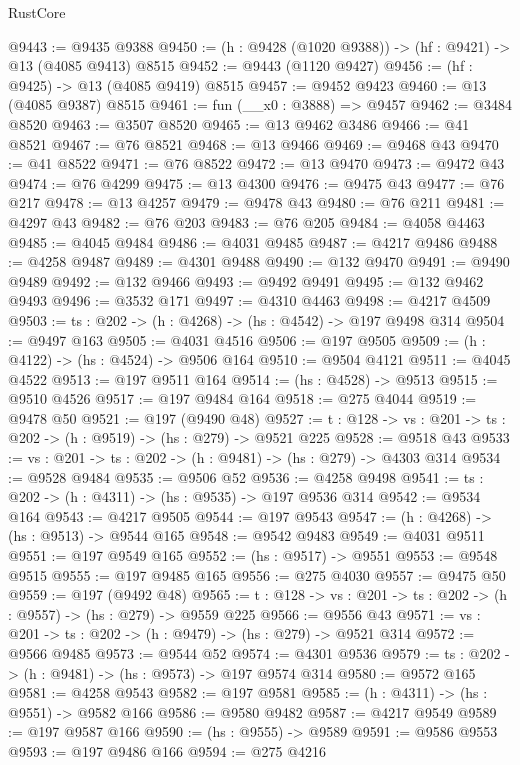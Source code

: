 \begin{lexlean}{RustCore}
\begin{coremodule}
@9443 := @9435 @9388
@9450 := (h : @9428 (@1020 @9388)) -> (hf : @9421) -> @13 (@4085 @9413) @8515
@9452 := @9443 (@1120 @9427)
@9456 := (hf : @9425) -> @13 (@4085 @9419) @8515
@9457 := @9452 @9423
@9460 := @13 (@4085 @9387) @8515
@9461 := fun (__x0 : @3888) => @9457
@9462 := @3484 @8520
@9463 := @3507 @8520
@9465 := @13 @9462 @3486
@9466 := @41 @8521
@9467 := @76 @8521
@9468 := @13 @9466
@9469 := @9468 @43
@9470 := @41 @8522
@9471 := @76 @8522
@9472 := @13 @9470
@9473 := @9472 @43
@9474 := @76 @4299
@9475 := @13 @4300
@9476 := @9475 @43
@9477 := @76 @217
@9478 := @13 @4257
@9479 := @9478 @43
@9480 := @76 @211
@9481 := @4297 @43
@9482 := @76 @203
@9483 := @76 @205
@9484 := @4058 @4463
@9485 := @4045 @9484
@9486 := @4031 @9485
@9487 := @4217 @9486
@9488 := @4258 @9487
@9489 := @4301 @9488
@9490 := @132 @9470
@9491 := @9490 @9489
@9492 := @132 @9466
@9493 := @9492 @9491
@9495 := @132 @9462 @9493
@9496 := @3532 @171
@9497 := @4310 @4463
@9498 := @4217 @4509
@9503 := {ts : @202} -> (h : @4268) -> (hs : @4542) -> @197 @9498 @314
@9504 := @9497 @163
@9505 := @4031 @4516
@9506 := @197 @9505
@9509 := (h : @4122) -> (hs : @4524) -> @9506 @164
@9510 := @9504 @4121
@9511 := @4045 @4522
@9513 := @197 @9511 @164
@9514 := (hs : @4528) -> @9513
@9515 := @9510 @4526
@9517 := @197 @9484 @164
@9518 := @275 @4044
@9519 := @9478 @50
@9521 := @197 (@9490 @48)
@9527 := {t : @128} -> {vs : @201} -> {ts : @202} -> (h : @9519) -> (hs : @279) -> @9521 @225
@9528 := @9518 @43
@9533 := {vs : @201} -> {ts : @202} -> (h : @9481) -> (hs : @279) -> @4303 @314
@9534 := @9528 @9484
@9535 := @9506 @52
@9536 := @4258 @9498
@9541 := {ts : @202} -> (h : @4311) -> (hs : @9535) -> @197 @9536 @314
@9542 := @9534 @164
@9543 := @4217 @9505
@9544 := @197 @9543
@9547 := (h : @4268) -> (hs : @9513) -> @9544 @165
@9548 := @9542 @9483
@9549 := @4031 @9511
@9551 := @197 @9549 @165
@9552 := (hs : @9517) -> @9551
@9553 := @9548 @9515
@9555 := @197 @9485 @165
@9556 := @275 @4030
@9557 := @9475 @50
@9559 := @197 (@9492 @48)
@9565 := {t : @128} -> {vs : @201} -> {ts : @202} -> (h : @9557) -> (hs : @279) -> @9559 @225
@9566 := @9556 @43
@9571 := {vs : @201} -> {ts : @202} -> (h : @9479) -> (hs : @279) -> @9521 @314
@9572 := @9566 @9485
@9573 := @9544 @52
@9574 := @4301 @9536
@9579 := {ts : @202} -> (h : @9481) -> (hs : @9573) -> @197 @9574 @314
@9580 := @9572 @165
@9581 := @4258 @9543
@9582 := @197 @9581
@9585 := (h : @4311) -> (hs : @9551) -> @9582 @166
@9586 := @9580 @9482
@9587 := @4217 @9549
@9589 := @197 @9587 @166
@9590 := (hs : @9555) -> @9589
@9591 := @9586 @9553
@9593 := @197 @9486 @166
@9594 := @275 @4216

\end{coremodule}
\end{lexlean}
